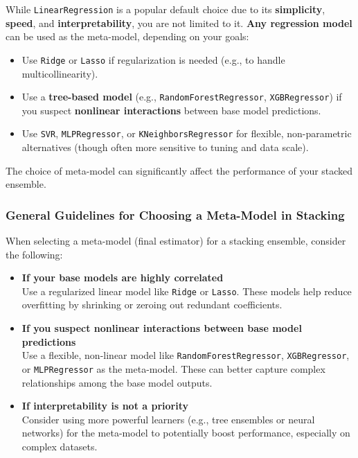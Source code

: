 \documentclass[
  letterpaper,
  DIV=11,
  numbers=noendperiod]{scrreprt}
\providecommand{\tightlist}{%
  \setlength{\itemsep}{0pt}\setlength{\parskip}{0pt}}\usepackage{longtable,booktabs,array}
\begin{document}
While \texttt{LinearRegression} is a popular default choice due to its
\textbf{simplicity}, \textbf{speed}, and \textbf{interpretability}, you
are not limited to it. \textbf{Any regression model} can be used as the
meta-model, depending on your goals:

\begin{itemize}
\tightlist
\item
  Use \texttt{Ridge} or \texttt{Lasso} if regularization is needed
  (e.g., to handle multicollinearity).
\item
  Use a \textbf{tree-based model} (e.g., \texttt{RandomForestRegressor},
  \texttt{XGBRegressor}) if you suspect \textbf{nonlinear interactions}
  between base model predictions.
\item
  Use \texttt{SVR}, \texttt{MLPRegressor}, or
  \texttt{KNeighborsRegressor} for flexible, non-parametric alternatives
  (though often more sensitive to tuning and data scale).
\end{itemize}

The choice of meta-model can significantly affect the performance of
your stacked ensemble.

\subsubsection{General Guidelines for Choosing a Meta-Model in
Stacking}\label{general-guidelines-for-choosing-a-meta-model-in-stacking}

When selecting a meta-model (final estimator) for a stacking ensemble,
consider the following:

\begin{itemize}
\item
  \textbf{If your base models are highly correlated}\\
  Use a regularized linear model like \texttt{Ridge} or \texttt{Lasso}.
  These models help reduce overfitting by shrinking or zeroing out
  redundant coefficients.
\item
  \textbf{If you suspect nonlinear interactions between base model
  predictions}\\
  Use a flexible, non-linear model like \texttt{RandomForestRegressor},
  \texttt{XGBRegressor}, or \texttt{MLPRegressor} as the meta-model.
  These can better capture complex relationships among the base model
  outputs.
\item
  \textbf{If interpretability is not a priority}\\
  Consider using more powerful learners (e.g., tree ensembles or neural
  networks) for the meta-model to potentially boost performance,
  especially on complex datasets.
\end{itemize}
\end{document}
